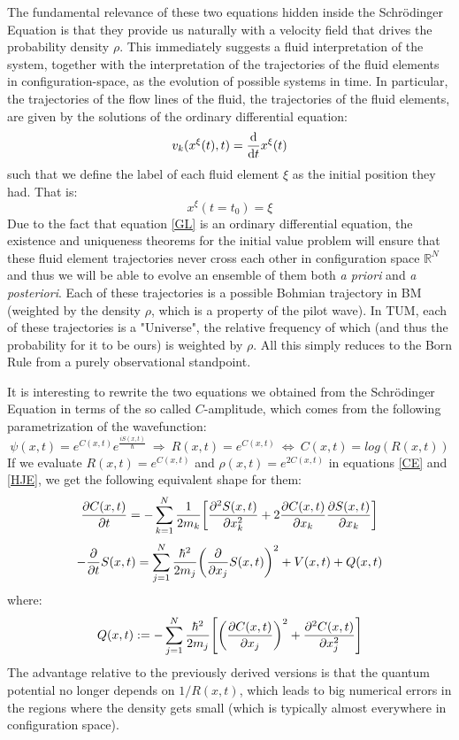 \documentclass[11pt, a4paper]{article} %
\newcommand{\R}{\mathbb{R}} %
\begin{document}
The fundamental relevance of these two equations hidden inside the Schrödinger Equation is that they provide us naturally with a velocity field that drives the probability density $\rho$. This immediately suggests a fluid interpretation of the system, together with the interpretation of the trajectories of the fluid elements in configuration-space, as the evolution of possible systems in time. In particular, the trajectories of the flow lines of the fluid, the trajectories of the fluid elements, are given by the solutions of the ordinary differential equation:
\begin{equation}\label{GL}
v_k(x^\xi(t),t)=\dv{}{t}x^\xi(t)
\end{equation}
such that we define the label of each fluid element $\xi$ as the initial position they had. That is:
\begin{equation}
x^\xi(t=t_0)=\xi
\end{equation}
Due to the fact that equation \eqref{GL} is an ordinary differential equation, the existence and uniqueness theorems for the initial value problem will ensure that these fluid element trajectories never cross each other in configuration space $\R^N$ and thus we will be able to evolve an ensemble of them both {\em a priori} and {\em a posteriori}. Each of these trajectories is a possible Bohmian trajectory in BM (weighted by the density $\rho$, which is a property of the pilot wave). In TUM, each of these trajectories is a "Universe", the relative frequency of which (and thus the probability for it to be ours) is weighted by $\rho$. All this simply reduces to the Born Rule from a purely observational standpoint.

It is interesting to rewrite the two equations we obtained from the Schrödinger Equation in terms of the so called $C$-amplitude, which comes from the following parametrization of the wavefunction:
\begin{equation}
\psi(x,t)=e^{C(x,t)}e^{\frac{iS(x,t)}{\hbar}}\ \Longrightarrow\ R(x,t)=e^{C(x,t)} \ \Leftrightarrow \ C(x,t)=log(R(x,t))
\end{equation}
If we evaluate $R(x,t)=e^{C(x,t)}$ and $\rho(x,t)=e^{2C(x,t)}$ in equations \eqref{CE} and \eqref{HJE}, we get the following equivalent shape for them:
\begin{equation}\label{CE.C}
\pdv{C(x,t)}{t} = -\sum_{k=1}^N \frac{1}{2m_k}\qty[\pdv[2]{S(x,t)}{x_k}+2\pdv{C(x,t)}{x_k}\pdv{S(x,t)}{x_k}]
\end{equation}
\begin{equation}\label{HJE.C}
-\pdv{}{t}S(x,t) = \sum_{j=1}^N \frac{\hbar^2}{2m_j} \qty(\pdv{}{x_j} S(x,t) )^2+ V(x,t)+Q(x,t)
\end{equation}
where:
\begin{equation}\label{QP}
Q(x,t):=-\sum_{j=1}^N \frac{\hbar^2}{2m_j}\qty[\qty(\pdv{C(x,t)}{x_j})^2+\pdv[2]{C(x,t)}{x_j}]
\end{equation}
The advantage relative to the previously derived versions is that the quantum potential no longer depends on $1/R(x,t)$, which leads to big numerical errors in the regions where the density gets small (which is typically almost everywhere in configuration space).
\end{document}
